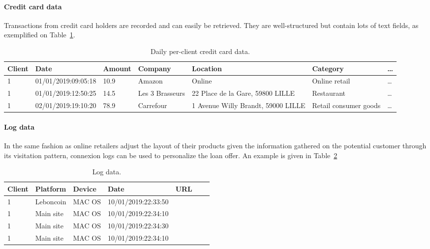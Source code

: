 \paragraph{Credit card data}

Transactions from credit card holders are recorded and can easily be retrieved. They are well-structured but contain lots of text fields, as exemplified on Table~\ref{tab:credit_card_data}.

\begin{table}[ht]
    \centering
    \caption{Daily per-client credit card data.}
    \label{tab:credit_card_data}
    \begin{tiny}
\begin{tabular}{lllllll}
Client & Date & Amount & Company & Location & Category & \dots \\
 \hline
1 & 01/01/2019:09:05:18 & 10.9 & Amazon & Online & Online retail & \dots \\
1 & 01/01/2019:12:50:25 & 14.5 & Les 3 Brasseurs & 22 Place de la Gare, 59800 LILLE & Restaurant & \dots \\
1 & 02/01/2019:19:10:20 & 78.9 & Carrefour & 1 Avenue Willy Brandt, 59000 LILLE & Retail consumer goods & \dots 
\end{tabular}
    \end{tiny}
\end{table}


\paragraph{Log data}

In the same fashion as online retailers adjust the layout of their products given the information gathered on the potential customer through its visitation pattern, connexion logs can be used to personalize the loan offer. An example is given in Table~\ref{tab:log_data}

\begin{table}[ht]
    \centering
    \caption{Log data.}
    \label{tab:log_data}
    \begin{small}
\begin{tabular}{lllllll}
Client & Platform & Device & Date & URL \\
 \hline
1 & Leboncoin & MAC OS & 10/01/2019:22:33:50 &  \\
1 & Main site & MAC OS & 10/01/2019:22:34:10 &  \\
1 & Main site & MAC OS & 10/01/2019:22:34:30 &  \\
1 & Main site & MAC OS & 10/01/2019:22:34:10 &  \\
\end{tabular}
    \end{small}
\end{table}






